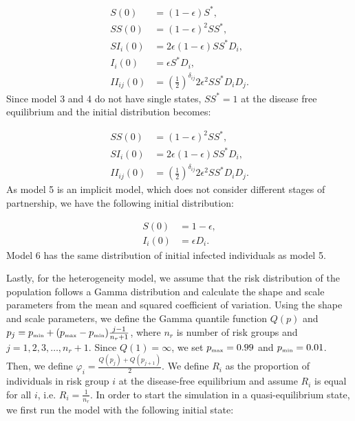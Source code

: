 \documentclass[10pt,letterpaper]{article}
\newcommand{\khalf}{\left(\frac{1}{2}\right)^{\delta_{ij}}}  %
\newcommand{\tsub}[2]{#1_{{\textrm{\tiny #2}}}}
\begin{document}
\begin{equation}
\begin{aligned}
S(0) &= (1 - \epsilon) S^*, \\
SS(0) &= (1 - \epsilon)^2 SS^*,\\
SI_i(0) &= 2 \epsilon (1-\epsilon) SS^* D_i,\\
I_i(0) &=  \epsilon S^* D_i,\\
II_{ij}(0) &=  \khalf 2\epsilon^2 SS^* D_i D_j.
\end{aligned}
\end{equation}
Since model 3 and 4 do not have single states, $SS^*=1$ at the disease free equilibrium and the initial distribution becomes:

\begin{equation}
\begin{aligned}
SS(0) &= (1 - \epsilon)^2 SS^*,\\
SI_i(0) &= 2 \epsilon (1-\epsilon) SS^* D_i,\\
II_{ij}(0) &=  \khalf 2\epsilon^2 SS^* D_i D_j.
\end{aligned}
\end{equation}
As model 5 is an implicit model, which does not consider different stages of partnership, we have the following initial distribution:

\begin{equation}
\begin{aligned}
S(0) &= 1 - \epsilon,\\
I_i(0) &=  \epsilon D_i.
\end{aligned}
\end{equation}
Model 6 has the same distribution of initial infected individuals as model 5.

Lastly, for the heterogeneity model, we assume that the risk distribution of the population follows a Gamma distribution and calculate the shape and scale parameters from the mean and squared coefficient of variation. Using the shape and scale parameters, we define the Gamma quantile function $Q(p)$ and $p_j =  \tsub{p}{min} + (\tsub{p}{max} - \tsub{p}{min}) \frac{j-1}{n_r + 1}$, where $n_r$ is number of risk groups and $j = 1, 2, 3, \dots, n_r + 1$. Since $Q(1) = \infty$, we set $\tsub{p}{max} = 0.99$ and $\tsub{p}{min} = 0.01$. Then, we define $\varphi_i = \frac{Q(p_j) + Q(p_{j+1})}{2}$. We define $R_i$ as the proportion of individuals in risk group $i$ at the disease-free equilibrium and assume $R_i$ is equal for all $i$, i.e. $R_i = \frac{1}{n_r}$. In order to start the simulation in a quasi-equilibrium state, we first run the model with the following initial state:
\end{document}
